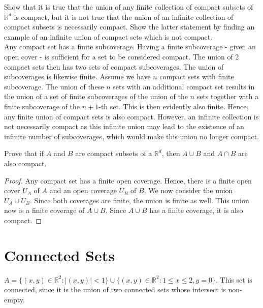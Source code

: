 \documentclass[12pt]{book}
\newcommand{\R}{\mathbb{R}}
\newenvironment{exercise}[2][Exercise]{\begin{trivlist}
\item[\hskip \labelsep {\bfseries #1}\hskip \labelsep {\bfseries #2.}]}{\end{trivlist}}
\begin{document}
\begin{exercise}{7.4.9}
Show that it is true that the union of any finite collection of compact
subsets of $\R^d$ is compact, but it is not true that the union of an infinite
collection of compact subsets is necessarily compact. Show the latter
statement by finding an example of an infinite union of compact sets which
is not compact. \\

Any compact set has a finite subcoverage. Having a finite subcoverage - given an open cover - is sufficient for a set to be considered compact. The union of 2 compact sets then has two sets of compact subcoverages. The union of subcoverages is likewise finite. Assume we have $n$ compact sets with finite subcoverage. The union of these $n$ sets with an additional compact set results in the union of a set of finite subcoverages of the union of the $n$ sets together with a finite subcoverage of the $n+1$-th set. This is then evidently also finite. Hence, any finite union of compact sets is also compact. However, an infinite collection is not necessarily compact as this infinite union may lead to the existence of an infinite number of subcoverages, which would make this union no longer compact. 
\end{exercise}



\begin{exercise}{7.4.10}
Prove that if $A$ and $B$ are compact subsets of a $\R^d$, then $A \cup B $ and $A \cap B$ are also compact.
\begin{proof}
    Any compact set has a finite open coverage. Hence, there is a finite open cover $U_A$ of $A$ and an open coverage $U_B$ of $B$. We now consider the union $U_A \cup U_B$. Since both coverages are finite, the union is finite as well. This union now is a finite coverage of $A \cup B$. Since $A \cup B$ has a finite coverage, it is also compact.
\end{proof}
\end{exercise}


\section{Connected Sets}

\begin{exercise}{7.5.1}
$A = \{ (x,y) \in \R^2 : |(x,y)| < 1 \} \cup \{ (x,y) \in \R^2 : 1 \leq x \leq 2, y= 0 \}.$
This set is connected, since it is the union of two connected sets whose intersect is non-empty.
\end{exercise}
\end{document}
